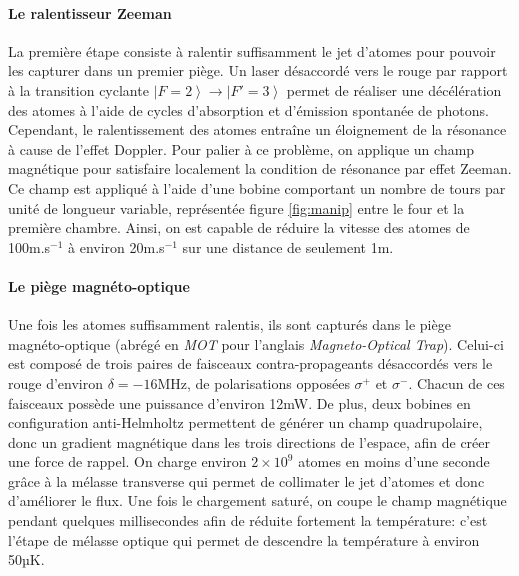 \paragraph*{Le ralentisseur Zeeman}
La première étape consiste à ralentir suffisamment le jet d'atomes pour pouvoir les capturer dans un premier piège. Un laser désaccordé vers le rouge par rapport à la transition cyclante $\left| F=2 \right\rangle \rightarrow\left| F'=3 \right\rangle$ permet de réaliser une décélération des atomes à l'aide de cycles d'absorption et d'émission spontanée de photons. Cependant, le ralentissement des atomes entraîne un éloignement de la résonance à cause de l'effet Doppler. Pour palier à ce problème, on applique un champ magnétique pour satisfaire localement la condition de résonance par effet Zeeman. Ce champ est appliqué à l'aide d'une bobine comportant un nombre de tours par unité de longueur variable, représentée figure \ref{fig:manip} entre le four et la première chambre.
Ainsi, on est capable de réduire la vitesse des atomes de 100m.s${}^{-1}$ à environ 20m.s${}^{-1}$ sur une distance de seulement 1m.

\paragraph*{Le piège magnéto-optique}
Une fois les atomes suffisamment ralentis, ils sont capturés dans le piège magnéto-optique (abrégé en \emph{MOT} pour l'anglais \textit{Magneto-Optical Trap}). Celui-ci est composé de trois paires de faisceaux contra-propageants désaccordés vers le rouge d'environ $\delta=-16$MHz, de polarisations opposées $\sigma^+$ et $\sigma^-$. Chacun de ces faisceaux possède une puissance d'environ 12mW.
De plus, deux bobines en configuration anti-Helmholtz permettent de générer un champ quadrupolaire, donc un gradient magnétique dans les trois directions de l'espace, afin de créer une force de rappel.
On charge environ $2 \times 10^9$ atomes en moins d'une seconde grâce à la mélasse transverse qui permet de collimater le jet d'atomes et donc d'améliorer le flux. 
Une fois le chargement saturé, on coupe le champ magnétique pendant quelques millisecondes afin de réduite fortement la température: c'est l'étape de mélasse optique qui permet de descendre la température à environ 50µK. 

